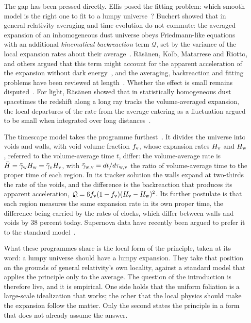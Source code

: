 \documentclass[aps,prd,reprint,amsmath,amssymb,superscriptaddress]{revtex4-2}
\begin{document}
The gap has been pressed directly. Ellis posed the fitting problem: which smooth model is the right one to fit to a lumpy universe~\cite{Ellis1984}? Buchert showed that in general relativity averaging and time evolution do not commute: the averaged expansion of an inhomogeneous dust universe obeys Friedmann-like equations with an additional \emph{kinematical backreaction} term $\mathcal{Q}$, set by the variance of the local expansion rates about their average~\cite{Buchert2000, Buchert2008}. R\"as\"anen, Kolb, Matarrese and Riotto, and others argued that this term might account for the apparent acceleration of the expansion without dark energy~\cite{Rasanen2004, Kolb2006}, and the averaging, backreaction and fitting problems have been reviewed at length~\cite{Clarkson2011, BuchertRasanen2012}. Whether the effect is small remains disputed~\cite{GreenWald2011, GreenWald2014, Buchert2015}. For light, R\"as\"anen showed that in statistically homogeneous dust spacetimes the redshift along a long ray tracks the volume-averaged expansion, the local departures of the rate from the average entering as a fluctuation argued to be small when integrated over long distances~\cite{Rasanen2009}.

The timescape model takes the programme furthest~\cite{Wiltshire2007, Wiltshire2007PRL, Wiltshire2009}. It divides the universe into voids and walls, with void volume fraction $f_{\rm v}$, whose expansion rates $H_{\rm v}$ and $H_{\rm w}$, referred to the volume-average time $t$, differ: the volume-average rate is $\bar H=\bar\gamma_{\rm w}H_{\rm w}=\bar\gamma_{\rm v}H_{\rm v}$, with $\bar\gamma_{\rm w,v}=dt/d\tau_{\rm w,v}$ the ratio of volume-average time to the proper time of each region. In its tracker solution the walls expand at two-thirds the rate of the voids, and the difference is the backreaction that produces its apparent acceleration, $\mathcal{Q}=6f_{\rm v}(1-f_{\rm v})(H_{\rm v}-H_{\rm w})^{2}$. Its further postulate is that each region measures the same expansion rate in its own proper time, the difference being carried by the rates of clocks, which differ between walls and voids by 38 percent today. Supernova data have recently been argued to prefer it to the standard model~\cite{Seifert2025}.

What these programmes share is the local form of the principle, taken at its word: a lumpy universe should have a lumpy expansion. They take that position on the grounds of general relativity's own locality, against a standard model that applies the principle only to the average. The question of the introduction is therefore live, and it is empirical. One side holds that the uniform foliation is a large-scale idealization that works; the other that the local physics should make the expansion follow the matter. Only the second states the principle in a form that does not already assume the answer.
\end{document}
